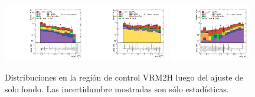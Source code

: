 \begin{figure}[ht!]
\begin{center}
   \includegraphics[width=0.32\textwidth]{images_tmp/results/fr2/can_VRM2H_dphi_jetmet_afterFit.pdf}
   \includegraphics[width=0.32\textwidth]{images_tmp/results/fr2/can_VRM2H_dphi_gammet_afterFit.pdf}
   \includegraphics[width=0.32\textwidth]{images_tmp/results/fr2/can_VRM2H_dphi_gamjet_afterFit.pdf}

   \caption{Distribuciones en la región de control VRM2H luego del ajuste de solo fondo. Las incertidumbre mostradas son sólo estadísticas.}
   \label{fig:dist_vrm2h_bkgonly}
 \end{center}
\end{figure}


